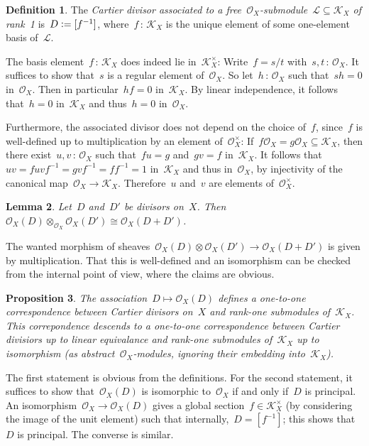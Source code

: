 \documentclass[10pt,reqno,a4paper]{amsbook}
\makeatletter
\theoremstyle{definition}
\newtheorem{defn}{Definition}[section]
\theoremstyle{plain}
\newtheorem{prop}[defn]{Proposition}
\newtheorem{lemma}[defn]{Lemma}
\theoremstyle{remark}
\renewcommand{\O}{\mathcal{O}}
\newcommand{\K}{\mathcal{K}}
\renewcommand{\L}{\mathcal{L}}
\newcommand{\?}{\,{:}\,}
\renewcommand{\_}{\mathpunct{.}\,}
\newcommand{\defeq}{\vcentcolon=}
\renewenvironment{proof}[1][\proofname]{\par
  \pushQED{\qed}%
  \normalfont \topsep6\p@\@plus6\p@\relax
  \trivlist
  \item[\hskip\labelsep
        \itshape
    #1\@addpunct{.}]\ignorespaces
}{%
  \popQED\endtrivlist\@endpefalse
}
\makeatother
\begin{document}
\begin{defn}The \emph{Cartier divisor associated to a free~$\O_X$-submodule~$\L \subseteq
\K_X$ of rank~1} is~$D \defeq [f^{-1}]$, where~$f\?\K_X$ is the unique element of
some one-element basis of~$\L$.\end{defn}

The basis element~$f\?\K_X$ does indeed lie in~$\K_X^\times$: Write~$f
= s/t$ with~$s,t \? \O_X$. It suffices to show that~$s$ is a regular element
of~$\O_X$. So let~$h\?\O_X$ such that~$sh = 0$ in~$\O_X$. Then in
particular~$hf = 0$ in~$\K_X$. By linear independence, it follows that~$h = 0$
in~$\K_X$ and thus~$h = 0$ in~$\O_X$.

Furthermore, the associated divisor does not depend on the choice of~$f$,
since~$f$ is well-defined up to multiplication by an element of~$\O_X^\times$: If~$f
\O_X = g \O_X \subseteq \K_X$, then there exist~$u,v\?\O_X$ such that~$fu = g$
and~$gv = f$ in~$\K_X$. It follows that~$uv = fuvf^{-1} = gvf^{-1} = ff^{-1} =
1$ in~$\K_X$ and thus in~$\O_X$, by injectivity of the canonical map~$\O_X \to
\K_X$. Therefore~$u$ and~$v$ are elements of~$\O_X^\times$.

\begin{lemma}Let~$D$ and~$D'$ be divisors on~$X$. Then~$\O_X(D) \otimes_{\O_X}
\O_X(D') \cong \O_X(D + D')$.\end{lemma}
\begin{proof}The wanted morphism of sheaves~$\O_X(D) \otimes \O_X(D') \to
\O_X(D + D')$ is given by multiplication. That this is well-defined and an
isomorphism can be checked from the internal point of view, where the claims
are obvious.\end{proof}

\begin{prop}The association~$D \mapsto \O_X(D)$ defines a one-to-one
correspondence between Cartier divisors on~$X$ and rank-one submodules
of~$\K_X$. This correpondence descends to a one-to-one correspondence between
Cartier divisiors up to linear equivalance and rank-one submodules of~$\K_X$ up
to isomorphism (as abstract~$\O_X$-modules, ignoring their embedding
into~$\K_X$).\end{prop}
\begin{proof}The first statement is obvious from the definitions. For the
second statement, it suffices to show that~$\O_X(D)$ is isomorphic to~$\O_X$ if
and only if~$D$ is principal. An isomorphism~$\O_X \to \O_X(D)$ gives a
global section~$f \in \K_X^\times$ (by considering the image of the unit element)
such that internally,~$D = [f^{-1}]$; this shows that~$D$ is principal. The
converse is similar.
\end{proof}
\end{document}
